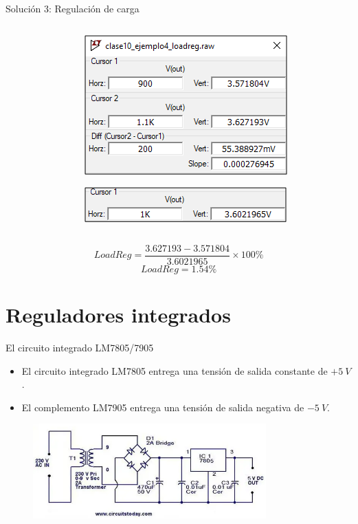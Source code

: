 \documentclass[t,aspectratio=169]{beamer}
\begin{document}
\begin{frame}{Solución 3: Regulación de carga}
\begin{columns}
\begin{column}{0.3\textwidth}
\end{column}
\begin{column}{0.3\textwidth}
\includegraphics[width=\textwidth]{figures/loadreg_measure.png}

\includegraphics[width=\textwidth]{figures/loadreg_measure2.png}
\end{column}
\end{columns}

\[ LoadReg = \dfrac{3.627193 - 3.571804}{3.6021965} \times 100\% \]
\[ LoadReg = 1.54\% \]
\end{frame}


\section{Reguladores integrados}
\begin{frame}{El circuito integrado LM7805/7905}

\begin{itemize}
    \item El circuito integrado LM7805 entrega una tensión de salida constante de $+5\ V$.
    \item El complemento LM7905 entrega una tensión de salida negativa de $-5\ V$.
\end{itemize}

\begin{figure}
    \centering
    \includegraphics[width=0.8\textwidth]{figures/regulated_power_supply_1.png}
\end{figure}
\end{frame}
\end{document}
